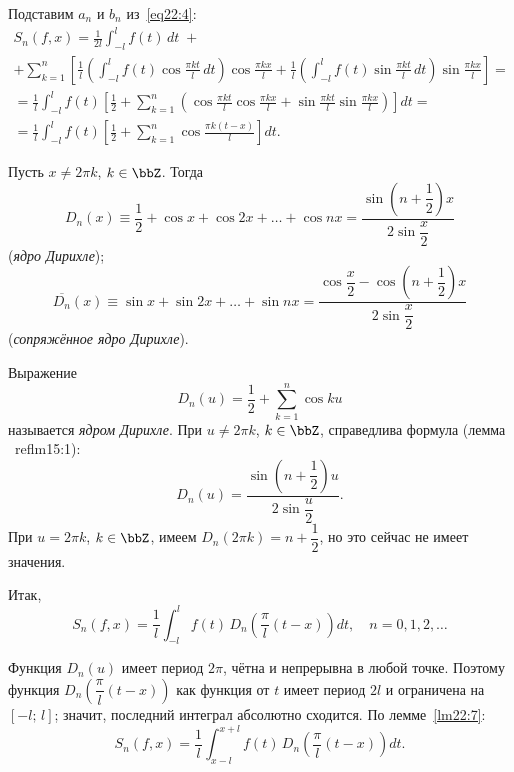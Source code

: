 Подставим $a_n$ и $b_n$ из~\eqref{eq22:4}:
\begin{multline*}
S_n(f, x) = \frac{1}{2l} \int_{-l}^{l} f(t)\,dt \; + \\
+ \sum_{k=1}^{n} \left[\frac{1}{l}\!\left(\int_{-l}^{l} f(t)\cos\frac{\pi k t}{l}\,dt\right) \cos\frac{\pi k x}{l} + \frac{1}{l}\!\left(\int_{-l}^{l} f(t)\sin\frac{\pi k t}{l}\,dt\right) \sin\frac{\pi k x}{l}\right] = \\
= \frac{1}{l} \int_{-l}^{l} f(t) \left[\frac{1}{2} + \sum_{k=1}^{n}\!\left(\cos\frac{\pi k t}{l}\cos\frac{\pi k x}{l} + \sin\frac{\pi k t}{l}\sin\frac{\pi k x}{l}\right)\right] dt = \\
= \frac{1}{l} \int_{-l}^{l} f(t) \left[\frac{1}{2} + \sum_{k=1}^{n} \cos\frac{\pi k (t - x)}{l}\right] dt.
\end{multline*}

\begin{lemm} \label{lm15:1}
Пусть $x \ne 2\pi k$, $k \in \bbZ$. Тогда
$$
D_n(x) \equiv \frac{1}{2} + \cos x + \cos 2x + \ldots + \cos nx = \frac{\sin\!\left(n + \dfrac{1}{2}\right) x}{2 \sin\dfrac{x}{2}}
$$
(\textit{ядро Дирихле});
$$
\overline{D_n}(x) \equiv \sin x + \sin 2x + \ldots + \sin nx = \frac{\cos\dfrac{x}{2} - \cos\!\left(n + \dfrac{1}{2}\right) x}{2 \sin\dfrac{x}{2}}
$$
(\textit{сопряжённое ядро Дирихле}).
\end{lemm}


\begin{defn} \label{df22:dirichlet}
Выражение
$$
D_n(u) = \frac{1}{2} + \sum_{k=1}^{n} \cos k u
$$
называется \textit{ядром Дирихле}. При $u \ne 2\pi k$, $k \in \bbZ$, справедлива формула (лемма ~ref{lm15:1}):
$$
D_n(u) = \frac{\sin\!\left(n + \dfrac{1}{2}\right) u}{2 \sin\dfrac{u}{2}}.
$$
При $u = 2\pi k$, $k \in \bbZ$, имеем $D_n(2\pi k) = n + \dfrac{1}{2}$, но это сейчас не имеет значения.
\end{defn}

Итак,
$$
S_n(f, x) = \frac{1}{l} \int_{-l}^{l} f(t)\, D_n\!\left(\frac{\pi}{l}(t - x)\right) dt, \quad n = 0, 1, 2, \ldots
$$

Функция $D_n(u)$ имеет период $2\pi$, чётна и непрерывна в любой точке. Поэтому функция $D_n\!\left(\dfrac{\pi}{l}(t - x)\right)$ как функция от $t$ имеет период $2l$ и ограничена на $[-l;\, l]$; значит, последний интеграл абсолютно сходится. По лемме~\ref{lm22:7}:
$$
S_n(f, x) = \frac{1}{l} \int_{x - l}^{x + l} f(t)\, D_n\!\left(\frac{\pi}{l}(t - x)\right) dt.
$$

